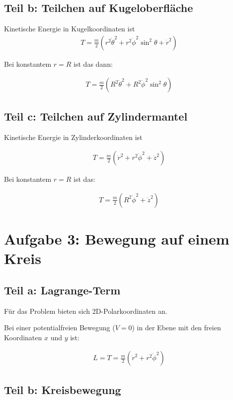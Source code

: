\documentclass[a4paper,german,12pt,smallheadings]{scrartcl}
\begin{document}
\subsection*{Teil b: Teilchen auf Kugeloberfläche}

Kinetische Energie in Kugelkoordinaten ist
\begin{align*}
  T = \frac{m}{2} (r^2 \dot{\theta}^2 + r^2 \dot{\phi}^2 \sin^2 \theta + \dot{r}^2)
\end{align*}

Bei konstantem $r = R$ ist das dann:

\begin{align*}
  T = \frac{m}{2} (R^2 \dot{\theta}^2 + R^2 \dot{\phi}^2 \sin^2 \theta)
\end{align*}


\subsection*{Teil c: Teilchen auf Zylindermantel}

Kinetische Energie in Zylinderkoordinaten ist

\begin{align*}
  T = \frac{m}{2} (\dot{r}^2 + r^2\dot{\phi}^2 + \dot{z}^2)
\end{align*}

Bei konstantem $r = R$ ist das:

\begin{align*}
  T = \frac{m}{2} (R^2\dot{\phi}^2 + \dot{z}^2)
\end{align*}

\section{Aufgabe 3: Bewegung auf einem Kreis}
\subsection*{Teil a: Lagrange-Term}

Für das Problem bieten sich 2D-Polarkoordinaten an.

Bei einer potentialfreien Bewegung ($V=0$) in der Ebene mit den freien
Koordinaten $x$ und $y$ ist:

\begin{align*}
  L = T = \frac{m}{2} (\dot{r}^2 + r^2\dot{\phi}^2)
\end{align*}

\subsection*{Teil b: Kreisbewegung}
\end{document}
